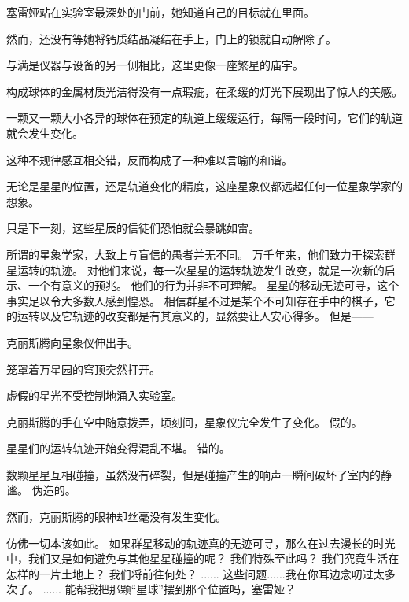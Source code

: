 \documentclass[openany]{book}
\begin{document}
塞雷娅站在实验室最深处的门前，她知道自己的目标就在里面。\par
然而，还没有等她将钙质结晶凝结在手上，门上的锁就自动解除了。\par
与满是仪器与设备的另一侧相比，这里更像一座繁星的庙宇。\par
构成球体的金属材质光洁得没有一点瑕疵，在柔缓的灯光下展现出了惊人的美感。\par
一颗又一颗大小各异的球体在预定的轨道上缓缓运行，每隔一段时间，它们的轨道就会发生变化。\par
这种不规律感互相交错，反而构成了一种难以言喻的和谐。\par
无论是星星的位置，还是轨道变化的精度，这座星象仪都远超任何一位星象学家的想象。\par
只是下一刻，这些星辰的信徒们恐怕就会暴跳如雷。

\begin{dialogue}
     所谓的星象学家，大致上与盲信的愚者并无不同。
     万千年来，他们致力于探索群星运转的轨迹。
     对他们来说，每一次星星的运转轨迹发生改变，就是一次新的启示、一个有意义的预兆。
     他们的行为并非不可理解。
     星星的移动无迹可寻，这个事实足以令大多数人感到惶恐。
     相信群星不过是某个不可知存在手中的棋子，它的运转以及它轨迹的改变都是有其意义的，显然要让人安心得多。
     但是——\par
    克丽斯腾向星象仪伸出手。\par
    笼罩着万星园的穹顶突然打开。\par
    虚假的星光不受控制地涌入实验室。\par
    克丽斯腾的手在空中随意拨弄，顷刻间，星象仪完全发生了变化。
     假的。\par
    星星们的运转轨迹开始变得混乱不堪。
     错的。\par
    数颗星星互相碰撞，虽然没有碎裂，但是碰撞产生的响声一瞬间破坏了室内的静谧。
     伪造的。\par
    然而，克丽斯腾的眼神却丝毫没有发生变化。\par
    仿佛一切本该如此。
     如果群星移动的轨迹真的无迹可寻，那么在过去漫长的时光中，我们又是如何避免与其他星星碰撞的呢？
     我们特殊至此吗？
     我们究竟生活在怎样的一片土地上？
     我们将前往何处？
     ......
     这些问题......我在你耳边念叨过太多次了。
     ......
     能帮我把那颗“星球”摆到那个位置吗，塞雷娅？\par

\end{dialogue}
\end{document}
